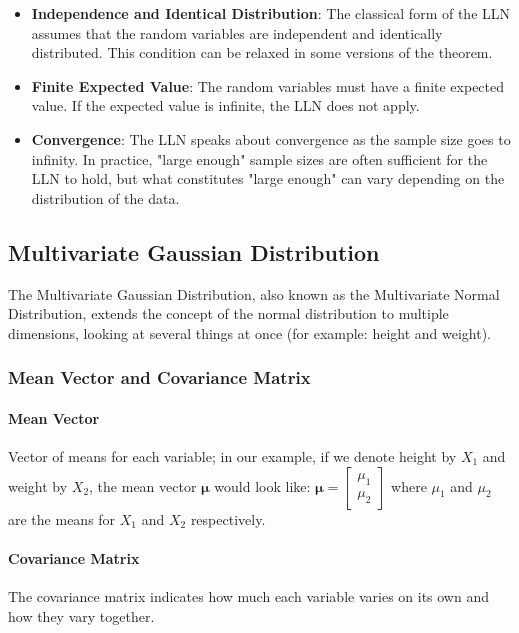 \documentclass{article}
\begin{document}
\begin{itemize}
    \item \textbf{Independence and Identical Distribution}: The classical form of the LLN assumes that the random variables are independent and identically distributed. This condition can be relaxed in some versions of the theorem.
    \item \textbf{Finite Expected Value}: The random variables must have a finite expected value. If the expected value is infinite, the LLN does not apply.
    \item \textbf{Convergence}: The LLN speaks about convergence as the sample size goes to infinity. In practice, "large enough" sample sizes are often sufficient for the LLN to hold, but what constitutes "large enough" can vary depending on the distribution of the data.
\end{itemize}

\subsection{Multivariate Gaussian Distribution}

The Multivariate Gaussian Distribution, also known as the Multivariate Normal Distribution, extends the concept of the normal distribution to multiple dimensions, looking at several things at once (for example: height and weight).

\subsubsection{Mean Vector and Covariance Matrix}

\paragraph{Mean Vector} Vector of means for each variable; in our example, if we denote height by $X_1$ and weight by $X_2$, the mean vector $\boldsymbol \mu$ would look like: $\boldsymbol \mu = \begin{bmatrix} \mu_1 \\ \mu_2 \end{bmatrix}$ where $\mu_1$ and $\mu_2$ are the means for $X_1$ and $X_2$ respectively.

\paragraph{Covariance Matrix} The covariance matrix indicates how much each variable varies on its own and how they vary together.
\end{document}
